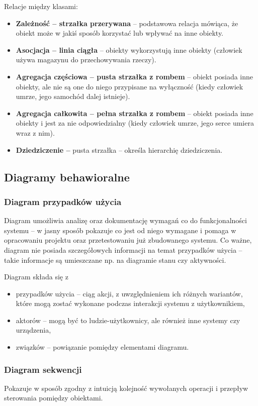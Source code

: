 Relacje między klasami:
\begin{itemize}
	\item{\textbf{Zależność -- strzałka przerywana} -- podstawowa relacja mówiąca, że obiekt może w jakiś sposób korzystać lub wpływać na inne obiekty.}
	\item{\textbf{Asocjacja -- linia ciągła} -- obiekty wykorzystują inne obiekty (człowiek używa magazynu do przechowywania rzeczy).}
	\item{\textbf{Agregacja częściowa -- pusta strzałka z rombem} -- obiekt posiada inne obiekty, ale nie są one do niego przypisane na wyłączność (kiedy człowiek umrze, jego samochód dalej istnieje).}
	\item{\textbf{Agregacja całkowita -- pełna strzałka z rombem} -- obiekt posiada inne obiekty i jest za nie odpowiedzialny (kiedy człowiek umrze, jego serce umiera wraz z nim).}
	\item{\textbf{Dziedziczenie --} pusta strzałka -- określa hierarchię dziedziczenia.}
\end{itemize}

\subsection{Diagramy behawioralne}
\subsubsection{Diagram przypadków użycia}
Diagram umożliwia analizę oraz dokumentację wymagań co do funkcjonalności systemu -- w jasny sposób pokazuje co jest od niego wymagane i pomaga w opracowaniu projektu oraz przetestowaniu już zbudowanego systemu. Co ważne, diagram nie posiada szczegółowych informacji na temat przypadków użycia -- takie informacje są umieszczane np. na diagramie stanu czy aktywności.

Diagram składa się z
\begin{itemize}
	\item{przypadków użycia -- ciąg akcji, z uwzględnieniem ich różnych wariantów, które mogą zostać wykonane podczas interakcji systemu z użytkownikiem,}
	\item{aktorów -- mogą być to ludzie-użytkownicy, ale również inne systemy czy urządzenia,}
	\item{związków -- powiązanie pomiędzy elementami diagramu.}
\end{itemize}
\subsubsection{Diagram sekwencji}
Pokazuje w sposób zgodny z intuicją kolejność wywołanych operacji i przepływ sterowania pomiędzy obiektami.

